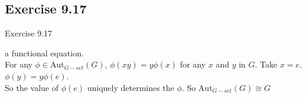 \documentclass[15pt]{scrartcl}
\begin{document}
\subsection{Exercise 9.17}
\begin{discussion*}Exercise 9.17
    \begin{abboy*}
        a functional equation.
        \\
        For any $\phi \in \text{Aut}_{G-set}(G)$, $\phi(xy)=y\phi(x) $ for any $x$ and $y$ in $G$. Take $x=e$. $\phi(y)=y\phi(e)$. 
        \\
        So the value of $\phi(e)$ uniquely determines the $\phi$. So $\text{Aut}_{G-set}(G) \cong G$
    \end{abboy*}

\end{discussion*}
\end{document}
